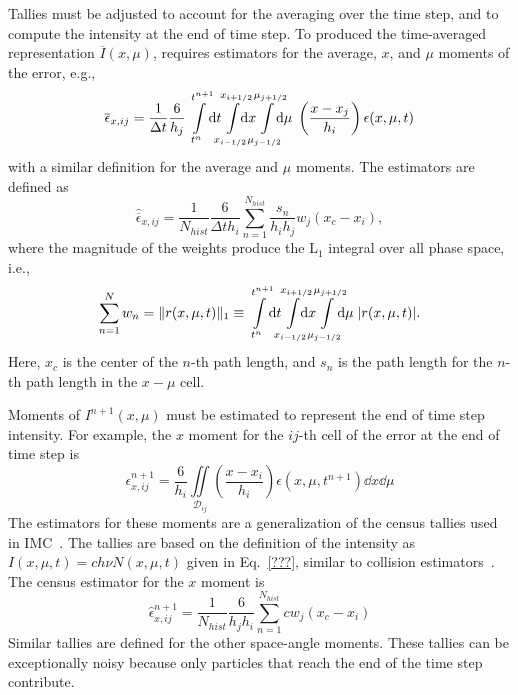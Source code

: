 Tallies must be adjusted to account for the averaging over the time step, and to compute the
intensity at the end of time step.  To produced the time-averaged representation
$\overline I(x,\mu)$, requires estimators for the average, $x$, and $\mu$ moments of the
error, e.g.,
\begin{equation}
    \overline\epsilon_{x,ij} = \frac{1}{\Delta t} \frac{6}{h_j}
    \int\limits_{t^{n}}^{t^{n+1}} \!\!\dd t \!\!\!
    \int\limits_{\xl}^{\xr} \!\!\!\!\! \dd x
    \hspace{-0.081in}\int\limits_{\mu_{j-1/2}}^{\mu_{j+1/2}} \hspace{-0.107in} \dd \mu
    \;\left(\frac{x - x_j}{h_{i}}\right) \epsilon(x,\mu,t)
\end{equation}
with a similar definition for the average and $\mu$ moments.  The estimators are defined
as
\begin{equation}
    \hat{\overline \epsilon}_{x,ij} =\frac{1}{N_{hist}} \frac{6}{\Delta t h_i} \sum_{n=1}^{N_{hist}}
    \frac{s_n}{h_{i}h_{j}} w_j \left(x_c - x_i\right),
\end{equation}
where the magnitude of the weights produce the L$_1$ integral over all phase space, i.e.,
\begin{equation}
\sum\limits_{n=1}^{N} w_n = \| r(x,\mu,t) \|_1 \equiv 
    \int\limits_{t^{n}}^{t^{n+1}} \!\!\dd t \!\!\!
    \int\limits_{\xl}^{\xr} \!\!\!\!\! \dd x
    \hspace{-0.081in}\int\limits_{\mu_{j-1/2}}^{\mu_{j+1/2}} \!\!\!\!\dd \mu\;
    |r(x,\mu,t)|.
\end{equation}
Here, $x_c$ is the center of the $n$-th
path length, and $s_{n}$ is the path length for the $n$-th path length in the $x-\mu$ cell.

Moments of $I^{n+1}(x,\mu)$ must be estimated to represent the end of time step intensity.
For example, the $x$ moment for the $ij$-th cell of the error at the end of time step is
\begin{equation}
    \epsilon^{n+1}_{x,ij} = \frac{6}{h_i} \iint\limits_{\mathcal{D}_{ij}} \left(\frac{x
    - x_i}{h_i}\right) \epsilon(x,\mu,t^{n+1}) \dd x \dd \mu
\end{equation}
The estimators for these moments are a generalization of the census
tallies used in IMC~\cite{wollaber_review,wollaber_thesis}.  The tallies are based on the
definition of the intensity as $I(x,\mu,t) = c h \nu N(x,\mu,t)$ given in
Eq.~\eqref{???}, similar to collision estimators~\cite{shultis_mc,mcnp}.  The census estimator for the $x$ moment is
\begin{equation}
    \hat\epsilon^{n+1}_{x,ij} = \frac{1}{N_{hist}} \frac{6}{h_j h_i} \sum_{n=1}^{N_{hist}}
    c w_j  \left(x_{c} - x_{i}\right)
\end{equation}
Similar tallies are defined for the other space-angle moments. These tallies can be
exceptionally noisy because only particles that reach the end of the time step contribute.


